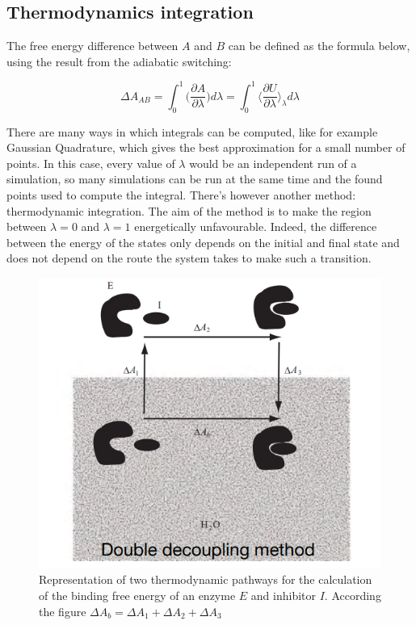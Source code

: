 	\subsection{Thermodynamics integration}
	The free energy difference between $A$ and $B$ can be defined as the formula below, using the result from the adiabatic switching:

	$$\Delta A_{AB} = \int_0^1\biggl(\frac{\partial A}{\partial \lambda}\biggr)d\lambda = \int_0^1\biggl\langle\frac{\partial U}{\partial\lambda}\biggr\rangle_\lambda d\lambda$$

	There are many ways in which integrals can be computed, like for example Gaussian Quadrature, which gives the best approximation for a small number of points.
	In this case, every value of $\lambda$ would be an independent run of a simulation, so many simulations can be run at the same time and the found points used to compute the integral.
	There's however another method: thermodynamic integration.
	The aim of the method is to make the region between $\lambda=0$ and $\lambda=1$ energetically unfavourable.
	Indeed, the difference between the energy of the states only depends on the initial and final state and does not depend on the route the system takes to make such a transition.

	\begin{figure}[H]
		\centering
		\includegraphics[scale=0.5]{ddm.png}
		\caption{Representation of two thermodynamic pathways for the calculation of the binding free energy of an enzyme $E$ and inhibitor $I$. According the figure $\Delta A_b = \Delta A_1 + \Delta A_2 + \Delta A_3$}
		\label{fig:ddm}
	\end{figure}

